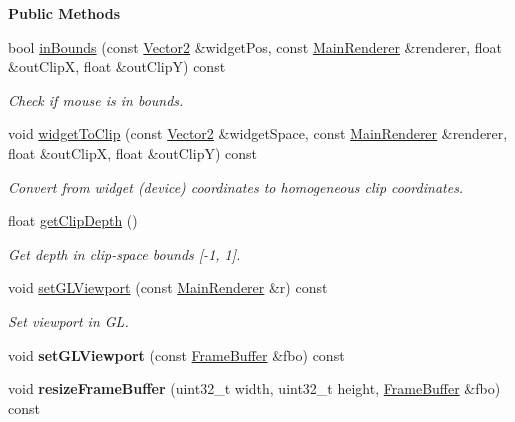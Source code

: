 \begin{Indent}\textbf{ Public Methods}\par
\begin{DoxyCompactItemize}
\item 
\mbox{\label{classrev_1_1_viewport_a6054e1dfe7c8c91360f19dde8cdde766}} 
bool \mbox{\hyperlink{classrev_1_1_viewport_a6054e1dfe7c8c91360f19dde8cdde766}{in\+Bounds}} (const \mbox{\hyperlink{classrev_1_1_vector}{Vector2}} \&widget\+Pos, const \mbox{\hyperlink{classrev_1_1_main_renderer}{Main\+Renderer}} \&renderer, float \&out\+ClipX, float \&out\+ClipY) const
\begin{DoxyCompactList}\small\item\em Check if mouse is in bounds. \end{DoxyCompactList}\item 
void \mbox{\hyperlink{classrev_1_1_viewport_a3dea0dbd5ee93f697941ef2da31e9185}{widget\+To\+Clip}} (const \mbox{\hyperlink{classrev_1_1_vector}{Vector2}} \&widget\+Space, const \mbox{\hyperlink{classrev_1_1_main_renderer}{Main\+Renderer}} \&renderer, float \&out\+ClipX, float \&out\+ClipY) const
\begin{DoxyCompactList}\small\item\em Convert from widget (device) coordinates to homogeneous clip coordinates. \end{DoxyCompactList}\item 
float \mbox{\hyperlink{classrev_1_1_viewport_ae4a69bf1e2757fa69131123282c63c08}{get\+Clip\+Depth}} ()
\begin{DoxyCompactList}\small\item\em Get depth in clip-\/space bounds \mbox{[}-\/1, 1\mbox{]}. \end{DoxyCompactList}\item 
\mbox{\label{classrev_1_1_viewport_a8cc0f28fc48c36886eed242cbdca085b}} 
void \mbox{\hyperlink{classrev_1_1_viewport_a8cc0f28fc48c36886eed242cbdca085b}{set\+G\+L\+Viewport}} (const \mbox{\hyperlink{classrev_1_1_main_renderer}{Main\+Renderer}} \&r) const
\begin{DoxyCompactList}\small\item\em Set viewport in GL. \end{DoxyCompactList}\item 
\mbox{\label{classrev_1_1_viewport_a519ee6e5e008829cf72991ed6abcda4d}} 
void {\bfseries set\+G\+L\+Viewport} (const \mbox{\hyperlink{classrev_1_1_frame_buffer}{Frame\+Buffer}} \&fbo) const
\item 
\mbox{\label{classrev_1_1_viewport_acb068c8adc27c3dbfa24d29c574cdc23}} 
void {\bfseries resize\+Frame\+Buffer} (uint32\+\_\+t width, uint32\+\_\+t height, \mbox{\hyperlink{classrev_1_1_frame_buffer}{Frame\+Buffer}} \&fbo) const
\end{DoxyCompactItemize}
\end{Indent}

